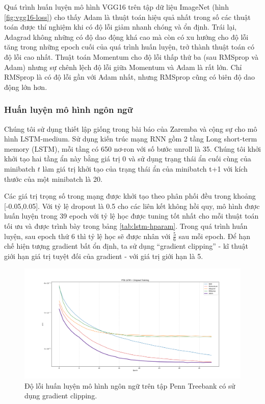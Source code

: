 Quá trình huấn luyện mô hình VGG16 trên tập dữ liệu ImageNet (hình \ref{fig:vgg16-loss}) cho thấy Adam là thuật toán hiệu quả nhất trong số các thuật toán được thí nghiệm khi có độ lỗi giảm nhanh chóng và ổn định. Trái lại, Adagrad không những có độ dao động khá cao mà còn có xu hướng cho độ lỗi tăng trong những epoch cuối của quá trình huấn luyện, trở thành thuật toán có độ lỗi cao nhất. Thuật toán Momentum cho độ lỗi thấp thứ ba (sau RMSprop và Adam) nhưng sự chênh lệch độ lỗi giữa Momentum và Adam là rất lớn. Chỉ RMSprop là có độ lỗi gần với Adam nhất, nhưng RMSprop cũng có biên độ dao động lớn hơn.

\subsubsection{Huấn luyện mô hình ngôn ngữ}
\label{exp:lstm}

Chúng tôi sử dụng thiết lập giống trong bài báo của Zaremba và cộng sự \cite{zaremba2014recurrent} cho mô hình LSTM-medium. Sử dụng kiến trúc mạng RNN gồm 2 tầng Long short-term memory (LSTM), mỗi tầng có 650 nơ-ron với số bước unroll là 35. Chúng tôi khởi khởi tạo hai tầng ẩn này bằng giá trị 0 và sử dụng trạng thái ẩn cuối cùng của minibatch $t$ làm giá trị khởi tạo của trạng thái ẩn của minibatch t+1 với kích thước của một minibatch là 20.

Các giá trị trọng số trong mạng được khởi tạo theo phân phối đều trong khoảng [-0.05,0.05]. Với tỷ lệ dropout là 0.5 cho các liên kết không hồi quy, mô hình được huấn luyện trong 39 epoch với tỷ lệ học được tuning tốt nhất cho mỗi thuật toán tối ưu và được trình bày trong bảng \ref{tab:lstm-hparam}. Trong quá trình huấn luyện, sau epoch thứ 6 thì tỷ lệ học sẽ được nhân với $\frac{5}{6}$ sau mỗi epoch. Để hạn chế hiện tượng gradient bất ổn định, ta sử dụng ``gradient clipping'' - kĩ thuật giới hạn giá trị tuyệt đối của gradient - với giá trị giới hạn là 5.

\begin{figure}[htp]
	\centering
	\includegraphics[width=140 mm]{images/ptb.png}
	\caption{Độ lỗi huấn luyện mô hình ngôn ngữ trên tập Penn Treebank có sử dụng gradient clipping.}
	\label{fig:ptb}
\end{figure}


